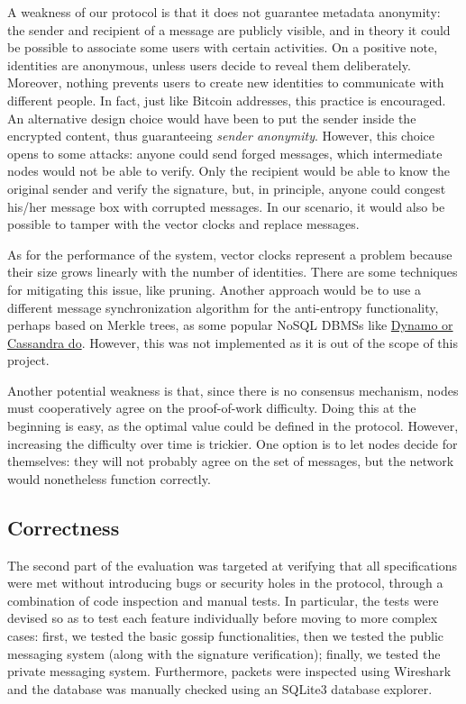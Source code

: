 \documentclass[a4paper,12pt]{article}
\begin{document}
A weakness of our protocol is that it does not guarantee metadata anonymity: the sender and recipient of a message are publicly visible, and in theory it could be possible to associate some users with certain activities. On a positive note, identities are anonymous, unless users decide to reveal them deliberately. Moreover, nothing prevents users to create new identities to communicate with different people. In fact, just like Bitcoin addresses, this practice is encouraged. An alternative design choice would have been to put the sender inside the encrypted content, thus guaranteeing \emph{sender anonymity}. However, this choice opens to some attacks: anyone could send forged messages, which intermediate nodes would not be able to verify. Only the recipient would be able to know the original sender and verify the signature, but, in principle, anyone could congest his/her message box with corrupted messages. In our scenario, it would also be possible to tamper with the vector clocks and replace messages.

As for the performance of the system, vector clocks represent a problem because their size grows linearly with the number of identities. There are some techniques for mitigating this issue, like pruning. Another approach would be to use a different message synchronization algorithm for the anti-entropy functionality, perhaps based on Merkle trees, as some popular NoSQL DBMSs like \href{https://wiki.apache.org/cassandra/AntiEntropy}{Dynamo or Cassandra do}. However, this was not implemented as it is out of the scope of this project.

Another potential weakness is that, since there is no consensus mechanism, nodes must cooperatively agree on the proof-of-work difficulty. Doing this at the beginning is easy, as the optimal value could be defined in the protocol. However, increasing the difficulty over time is trickier. One option is to let nodes decide for themselves: they will not probably agree on the set of messages, but the network would nonetheless function correctly.


\subsection*{Correctness}
The second part of the evaluation was targeted at verifying that all specifications were met without introducing bugs or security holes in the protocol, through a combination of code inspection and manual tests. In particular, the tests were devised so as to test each feature individually before moving to more complex cases: first, we tested the basic gossip functionalities, then we tested the public messaging system (along with the signature verification); finally, we tested the private messaging system. Furthermore, packets were inspected using Wireshark and the database was manually checked using an SQLite3 database explorer.
\end{document}
